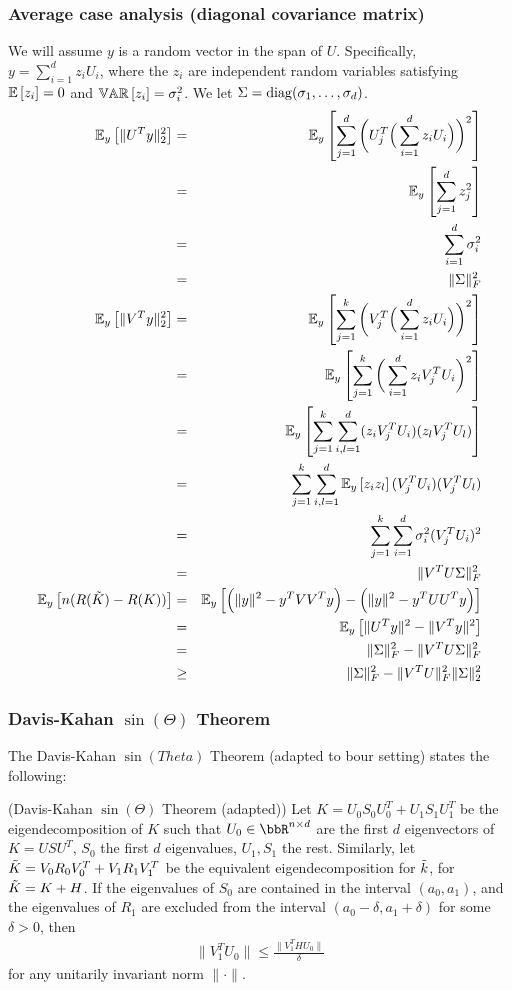 \subsubsection{Average case analysis (diagonal covariance matrix)}
We will assume $y$ is a random vector in the span of $U$.
Specifically, $y = \sum_{i=1}^d z_i U_i$, where the $z_i$ are independent random variables satisfying $\expect{}{z_i} = 0$ and $\var{}{z_i} = \sigma_i^2$.
We let $\Sigma = \diag(\sigma_1,\ldots,\sigma_d)$.
\begin{eqnarray*}
	\expect{y}{\|U^T y\|_2^2} &=& \expect{y}{\sum_{j=1}^d \bigg( U_j^T \Big(\sum_{i=1}^d z_i U_i\Big)\bigg)^2} \\
	&=& \expect{y}{\sum_{j=1}^d z_j^2} \\
	&=& \sum_{i=1}^d \sigma_i^2 \\
	&=& \|\Sigma\|_F^2 \\
	\expect{y}{\|V^T y\|_2^2} &=& \expect{y}{\sum_{j=1}^k \bigg( V_j^T \Big(\sum_{i=1}^d z_i U_i\Big)\bigg)^2} \\
	&=& \expect{y}{\sum_{j=1}^k \bigg(\sum_{i=1}^d z_i V_j^TU_i\bigg)^2} \\
	&=& \expect{y}{\sum_{j=1}^k \sum_{i,l=1}^d (z_i V_j^TU_i) (z_l V_j^TU_l) }\\
	&=& \sum_{j=1}^k \sum_{i,l=1}^d \expect{y}{z_i z_l} (V_j^TU_i) (V_j^TU_l) \\
	&=& \sum_{j=1}^k \sum_{i=1}^d \sigma_i^2 (V_j^TU_i)^2 \\
	&=& \|V^T U \Sigma\|_F^2\\
	\expect{y}{n(R(\tK) - R(K))} &=& \expect{y}{\Big(\|y\|^2 - y^T VV^T y\Big) - \Big(\|y\|^2 - y^T UU^T y\Big)}\\
	&=& \expect{y}{\|U^T y\|^2 - \|V^Ty\|^2}\\
	&=& \|\Sigma\|_F^2 -  \|V^T U\Sigma\|_F^2\\
	&\geq& \|\Sigma\|_F^2 -  \|V^T U\|_F^2 \|\Sigma\|_2^2\\
\end{eqnarray*}

\subsubsection{Davis-Kahan $\sin(\Theta)$ Theorem}
The Davis-Kahan $\sin(Theta)$ Theorem (adapted to bour setting) states the following:
\begin{theorem}{(Davis-Kahan $\sin(\Theta)$ Theorem (adapted))}
Let $K=U_0 S_0 U_0^T + U_1 S_1 U_1^T$ be the eigendecomposition of $K$ such that $U_0 \in \RR^{n \times d}$ are the first $d$ eigenvectors of $K=USU^T$, $S_0$ the first $d$ eigenvalues, $U_1,S_1$ the rest.
Similarly, let $\tK = V_0 R_0 V_0^T + V_1 R_1 V_1^T$ be the equivalent eigendecomposition for $\tk$, for $\tK = K + H$.
If the eigenvalues of $S_0$ are contained in the interval $(a_0,a_1)$, and the eigenvalues of $R_1$ are excluded from the interval $(a_0 - \delta,a_1 +\delta)$ for some $\delta>0$, then
\begin{eqnarray}
\|V_1^T U_0\| \leq \frac{\|V_1^T H U_0\|}{\delta}
\end{eqnarray}
for any unitarily invariant norm $\|\cdot \|$.
\end{theorem}

